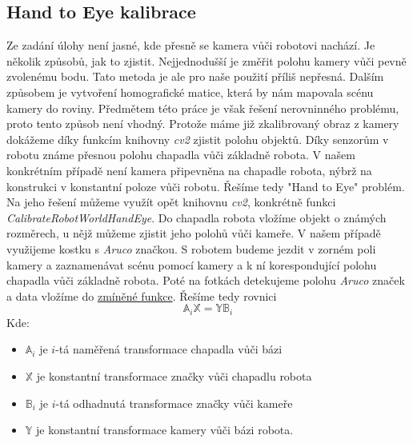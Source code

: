 \documentclass[journal,twoside,web]{ieeecolor}
\begin{document}
\subsection{Hand to Eye kalibrace}
    Ze zadání úlohy není jasné, kde přesně se kamera vůči robotovi nachází. Je několik způsobů, jak to zjistit.
    Nejjednodušší je změřit polohu kamery vůči pevně zvolenému bodu. Tato metoda je ale pro naše použití
    příliš nepřesná. Dalším způsobem je vytvoření homografické matice, která by nám mapovala scénu kamery
    do roviny. Předmětem této práce je však řešení nerovninného problému, proto tento způsob není vhodný.
    Protože máme již zkalibrovaný obraz z kamery dokážeme díky funkcím knihovny \textit{cv2} zjistit polohu
    objektů. Díky senzorům v robotu známe přesnou polohu chapadla vůči základně robota. V našem konkrétním případě
    není kamera připevněna na chapadle robota, nýbrž na konstrukci v konstantní poloze vůči robotu.
    Řešíme tedy "Hand to Eye" problém. Na jeho řešení můžeme využít opět knihovnu \textit{cv2}, konkrétně
    funkci \hypertarget{cv2Handeye}{\textit{CalibrateRobotWorldHandEye}}. Do chapadla robota vložíme objekt o známých rozměrech,
    u nějž můžeme zjistit jeho polohů vůči kameře. V našem případě využijeme kostku s \textit{Aruco} značkou.
    S robotem budeme jezdit v zorném poli kamery a zaznamenávat scénu pomocí kamery a k ní korespondující
    polohu chapadla vůči základně robota. Poté na fotkách detekujeme polohu \textit{Aruco} značek a data vložíme
    do \hyperlink{cv2Handeye}{zmíněné funkce}. Řešíme tedy rovnici
    \begin{equation}
        \mathbb{A}_i \mathbb{X} = \mathbb{Y}\mathbb{B}_i
    \end{equation}
    Kde:
    \begin{itemize}
        \item $\mathbb{A}_i$ je $i$-tá naměřená transformace chapadla vůči bázi\\
        \item $\mathbb{X}$ je konstantní transformace značky vůči chapadlu robota\\
        \item $\mathbb{B}_i$ je $i$-tá odhadnutá transformace značky vůči kameře\\
        \item $\mathbb{Y}$ je konstantní transformace kamery vůči bázi robota.
    \end{itemize}
\end{document}
